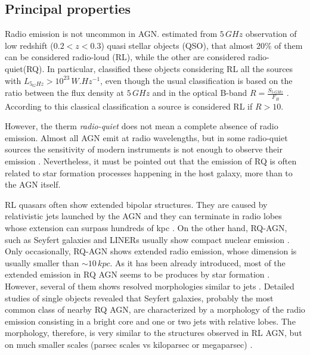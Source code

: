 \documentclass[../main.tex]{subfiles}
\begin{document}
\subsection{Principal properties}
\label{sec:princ_prop}

Radio emission is not uncommon in AGN.
\citet{Kellerman16} estimated from $5\,\si{GHz}$ observation of low redshift ($0.2<z<0.3$) quasi stellar objects (QSO), that almost $20\%$ of them can be considered radio-loud (RL), while the other are considered radio-quiet(RQ).
In particular, \citet{Kellermann16} classified these objects considering RL all the sources with $L_{5_GHz}>10^{23}\,\si{W.Hz^{-1}}$, even though the usual classification is based on the ratio between the flux density at $5\,\si{GHz}$ and in the optical B-band $R=\frac{S_{5\,\si{GHz}}}{F_{B}}$ \citep{Kellermann89}.
According to this classical classification a source is considered RL if $R>10$.

However, the therm \emph{radio-quiet} does not mean a complete absence of radio emission.
Almost all AGN emit at radio wavelengths, but in some radio-quiet sources the sensitivity of modern instruments is not enough to observe their emission \citep{Kellermann16}.
Nevertheless, it must be pointed out that the emission of RQ is often related to star formation processes happening in the host galaxy, more than to the AGN itself.

RL quasars often show extended bipolar structures.
They are caused by relativistic jets launched by the AGN and they can terminate in radio lobes whose extension can surpass hundreds of kpc \citep[e.g][]{Fanaroff74,Perley79,Bridle94}.
On the other hand, RQ-AGN, such as Seyfert galaxies and LINERs usually show compact nuclear emission \citep{Singh15}.
Only occasionally, RQ-AGN shows extended radio emission, whose dimension is usually smaller than $\sim 10\,\si{kpc}$.
As it has been already introduced, most of the extended emission in RQ AGN seems to be produces by star formation \citep{Baum93, Kellermann16}.
However, several of them shows resolved morphologies similar to jets \citep{Baum93,Colbert96,Morganti99,Gallimore06,Singh15, Singh15b}.
Detailed studies of single objects revealed that Seyfert galaxies, probably the most common class of nearby RQ AGN, are characterized by a morphology of the radio emission consisting in a bright core and one or two jets with relative lobes.
The morphology, therefore, is very similar to the structures observed in RL AGN, but on much smaller scales (parsec scales vs kiloparsec or megaparsec) \citep[e.g.][]{Wrobel84,Ulvestad87,Morganti99,Kukula99,Momjian03,Kharb06}.
\end{document}
